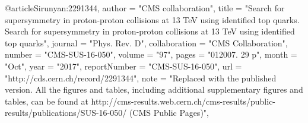 @article{Sirunyan:2291344,
      author        = "{CMS collaboration}",
      title         = "{Search for supersymmetry in proton-proton collisions at
                       13 TeV using identified top quarks. Search for
                       supersymmetry in proton-proton collisions at 13 TeV using
                       identified top quarks}",
      journal       = "Phys. Rev. D",
      collaboration = "CMS Collaboration",
      number        = "CMS-SUS-16-050",
      volume        = "97",
      pages         = "012007. 29 p",
      month         = "Oct",
      year          = "2017",
      reportNumber  = "CMS-SUS-16-050",
      url           = "http://cds.cern.ch/record/2291344",
      note          = "Replaced with the published version. All the figures and
                       tables, including additional supplementary figures and
                       tables, can be found at
                       http://cms-results.web.cern.ch/cms-results/public-results/publications/SUS-16-050/
                       (CMS Public Pages)",
}

